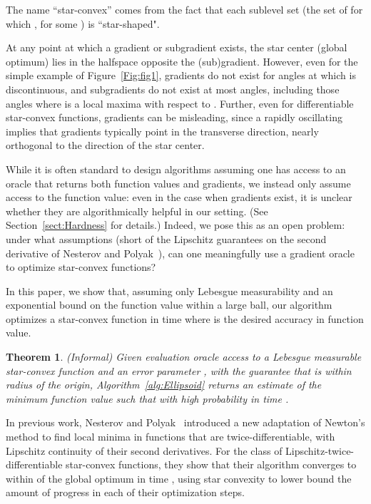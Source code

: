 \documentclass[11pt,letter]{article}
\newcounter{nTheorems}
\numberwithin{nTheorems}{section}
\newtheorem{theorem}[nTheorems]{Theorem}
\begin{document}
The name ``star-convex'' comes from the fact that each sublevel set (the set of  for which , for some ) is ``star-shaped".

At any point at which a gradient or subgradient exists, the star center (global optimum) lies in the halfspace opposite the (sub)gradient. However, even for the simple example of Figure~\ref{Fig:fig1}, gradients do not exist for angles  at which  is discontinuous, and subgradients do not exist at most angles, including those angles where  is a local maxima with respect to . Further, even for differentiable star-convex functions, gradients can be misleading, since a rapidly oscillating  implies that gradients typically point in the transverse direction, nearly orthogonal to the direction of the star center.

While it is often standard to design algorithms assuming one has access to an oracle that returns both function values and gradients, we instead only assume access to the function value: even in the case when gradients exist, it is unclear whether they are algorithmically helpful in our setting. (See Section~\ref{sect:Hardness} for details.) Indeed, we pose this as an open problem: under what assumptions (short of the Lipschitz guarantees on the second derivative of Nesterov and Polyak~\cite{Nesterov:2006}), can one meaningfully use a gradient oracle to optimize star-convex functions?

In this paper, we show that, assuming only Lebesgue measurability and an exponential bound on the function value within a large ball, our algorithm optimizes a star-convex function in  time where  is the desired accuracy in function value.

\begin{theorem}
\label{thm:InformalIntro} (Informal)
Given evaluation oracle access to a Lebesgue measurable star-convex function  and an error parameter , with the guarantee that  is within radius  of the origin, Algorithm~\ref{alg:Ellipsoid} returns an estimate  of the minimum function value such that  with high probability in time .
\end{theorem}

In previous work, Nesterov and Polyak~\cite{Nesterov:2006} introduced a new adaptation of Newton's method to find local minima in functions that are twice-differentiable, with Lipschitz continuity of their second derivatives. For the class of Lipschitz-twice-differentiable star-convex functions, they show that their algorithm converges to within  of the global optimum in time , using star convexity to lower bound the amount of progress in each of their optimization steps.
\end{document}
